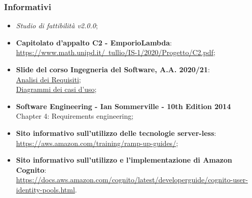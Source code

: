 \subsubsection{Informativi}
\begin{itemize}
    \item \textit{Studio di fattibilità v2.0.0};
    \item \textbf{Capitolato d'appalto C2 - EmporioLambda}:\\ \href{https://www.math.unipd.it/~tullio/IS-1/2020/Progetto/C2.pdf}{https://www.math.unipd.it/~tullio/IS-1/2020/Progetto/C2.pdf};
    \item \textbf{Slide del corso Ingegneria del Software, A.A. 2020/21}: \\ \href{https://www.math.unipd.it/~tullio/IS-1/2020/Dispense/L07.pdf}{Analisi dei Requisiti}; \\ \href{https://www.math.unipd.it/~rcardin/swea/2021/Diagrammi%20Use%20Case_4x4.pdf}{Diagrammi dei casi d'uso};
    \item \textbf{Software Engineering - Ian Sommerville - 10th Edition 2014}\\
          Chapter 4: Requirements engineering;
    \item \textbf{Sito informativo sull'utilizzo delle tecnologie server-less}:\\ \href{https://aws.amazon.com/training/ramp-up-guides/}{https://aws.amazon.com/training/ramp-up-guides/};
    \item \textbf{Sito informativo sull'utilizzo e l'implementazione di Amazon Cognito}:\\ \href{https://docs.aws.amazon.com/cognito/latest/developerguide/cognito-user-identity-pools.html}{https://docs.aws.amazon.com/cognito/latest/developerguide/cognito-user-identity-pools.html}.
\end{itemize}
